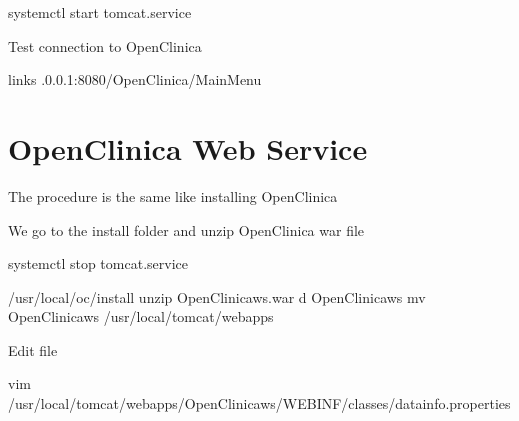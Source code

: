 \documentclass[letterpaper,10pt,english]{sphinxmanual}
\begin{document}
%
\begin{sphinxVerbatim}[commandchars=\\\{\}]
systemctl start tomcat.service
\end{sphinxVerbatim}

Test connection to OpenClinica

%
\begin{sphinxVerbatim}[commandchars=\\\{\}]
links .0.0.1:8080/OpenClinica/MainMenu
\end{sphinxVerbatim}


\section{OpenClinica Web Service}
\label{\detokenize{trl1:openclinica-web-service}}
The procedure is the same like installing OpenClinica

We go to the install folder and unzip OpenClinica war file

%
\begin{sphinxVerbatim}[commandchars=\\\{\}]
systemctl stop tomcat.service
\end{sphinxVerbatim}

%
\begin{sphinxVerbatim}[commandchars=\\\{\}]
 /usr/local/oc/install
unzip OpenClinica\PYGZhy{}ws.war \PYGZhy{}d OpenClinica\PYGZhy{}ws
mv OpenClinica\PYGZhy{}ws /usr/local/tomcat/webapps
\end{sphinxVerbatim}

Edit  file

%
\begin{sphinxVerbatim}[commandchars=\\\{\}]
vim /usr/local/tomcat/webapps/OpenClinica\PYGZhy{}ws/WEB\PYGZhy{}INF/classes/datainfo.properties
\end{sphinxVerbatim}
\end{document}
